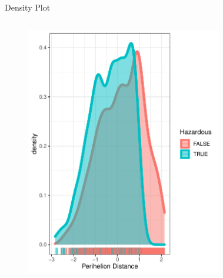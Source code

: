 \documentclass{beamer}
\begin{document}
\begin{frame}{Density Plot}
\begin{columns}
  \begin{figure}[b]{\textwidth}
    \centering
    \includegraphics[width=\textwidth]{Pic/DENSITY_Perihelion_Distance.pdf}
    \vspace{4ex}
  \end{figure} 
  \begin{figure}[b]{\textwidth}
    \centering

\end{figure}
\end{columns}
\end{frame}
\end{document}
